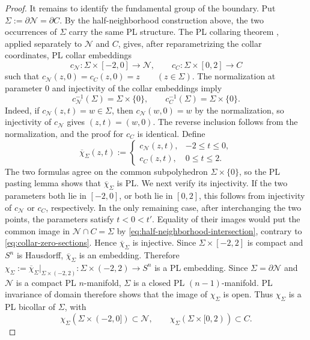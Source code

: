 \documentclass[12pt,oneside,a4paper]{article}
\theoremstyle{mytheorem}
\theoremstyle{remark}
\theoremstyle{definition}
\begin{document}
\begin{proof}
It remains to identify the fundamental group of the boundary.  Put
$\Sigma:=\partial\mathcal{N}=\partial C.$
By the half-neighborhood construction above, the two occurrences of $\Sigma$ carry the
same PL structure.  The PL collaring theorem
\cite[Corollary~2.5]{zbMATH01714503}, applied separately to
$\mathcal{N}$ and $C$, gives, after reparametrizing the collar
coordinates, PL collar embeddings
\[
 c_{\mathcal{N}}:\Sigma\times[-2,0]\longrightarrow\mathcal{N},
 \qquad
 c_C:\Sigma\times[0,2]\longrightarrow C
\]
such that
$c_{\mathcal{N}}(z,0)=c_C(z,0)=z\qquad(z\in\Sigma).$
The normalization at parameter $0$ and injectivity of the collar
embeddings imply
\begin{equation}\label{eq:collar-zero-sections}
 c_{\mathcal{N}}^{-1}(\Sigma)=\Sigma\times\{0\},
 \qquad
 c_C^{-1}(\Sigma)=\Sigma\times\{0\}.
\end{equation}
Indeed, if $c_{\mathcal{N}}(z,t)=w\in\Sigma$, then
$c_{\mathcal{N}}(w,0)=w$ by the normalization, so injectivity of
$c_{\mathcal{N}}$ gives $(z,t)=(w,0)$.  The reverse inclusion follows
from the normalization, and the proof for $c_C$ is identical.
Define
\[
 \overline\chi_\Sigma(z,t):=
 \begin{cases}
  c_{\mathcal{N}}(z,t),&-2\leq t\leq0,\\
  c_C(z,t),&0\leq t\leq2.
 \end{cases}
\]
The two formulas agree on the common subpolyhedron
$\Sigma\times\{0\}$, so the PL pasting lemma shows that
$\overline\chi_\Sigma$ is PL.  We next verify its injectivity.  If the
two parameters both lie in $[-2,0]$, or both lie in $[0,2]$, this
follows from injectivity of $c_{\mathcal{N}}$ or $c_C$, respectively.
In the only remaining case, after interchanging the two points, the
parameters satisfy $t<0<t'$.  Equality of their images would put the
common image in $\mathcal{N}\cap C=\Sigma$ by
\eqref{eq:half-neighborhood-intersection}, contrary to
\eqref{eq:collar-zero-sections}.  Hence $\overline\chi_\Sigma$ is
injective.  Since $\Sigma\times[-2,2]$ is compact and $S^n$ is
Hausdorff, $\overline\chi_\Sigma$ is an embedding.  Therefore
$\chi_\Sigma:=\overline\chi_\Sigma\big|_{\Sigma\times(-2,2)}
:\Sigma\times(-2,2)\to  S^n$ is a PL embedding.  Since
$\Sigma=\partial\mathcal{N}$ and
$\mathcal{N}$ is a compact PL $n$-manifold, $\Sigma$ is a closed PL
$(n-1)$-manifold.  PL invariance of domain therefore shows that the
image of $\chi_\Sigma$ is open.  Thus $\chi_\Sigma$ is a PL bicollar of
$\Sigma$, with
\[
 \chi_\Sigma(\Sigma\times(-2,0])\subset\mathcal{N},
 \qquad
 \chi_\Sigma(\Sigma\times[0,2))\subset C.
\]
\end{proof}
\end{document}
